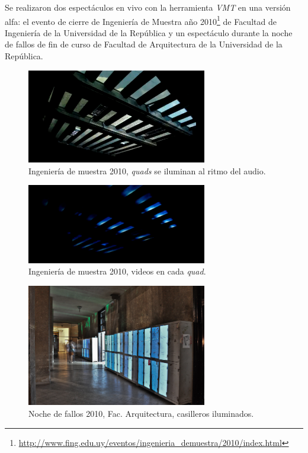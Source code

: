 Se realizaron dos espectáculos en vivo con la herramienta \emph{VMT} en una versión alfa: el evento de cierre de Ingeniería de Muestra año 2010\footnote{\url{http://www.fing.edu.uy/eventos/ingenieria_demuestra/2010/index.html}} de Facultad de Ingeniería de la Universidad de la República y un espectáculo durante la noche de fallos de fin de curso de Facultad de Arquitectura de la Universidad de la República.
\begin{figure}[H]
  \centering
    \includegraphics[width=0.7\textwidth]{./Cap7_conclusiones/ingMuestra1.png}
  \caption[Imagen propia]{Ingeniería de muestra 2010, \emph{quads} se iluminan al ritmo del audio.}
  \label{fig:ingMuestra1}
\end{figure}
\begin{figure}[H]
  \centering
    \includegraphics[width=0.7\textwidth]{./Cap7_conclusiones/ingMuestra2.png}
  \caption[Imagen propia]{Ingeniería de muestra 2010, videos en cada \emph{quad}.}
  \label{fig:ingMuestra2}
\end{figure}

\begin{figure}[H]
  \centering
    \includegraphics[width=0.7\textwidth]{./Cap7_conclusiones/Arqui1.jpg}
  \caption[http://www.farq.edu.uy/patio/conferencias-exposiciones-y-seminarios/noche-de-fallos-7.html]{Noche de fallos 2010, Fac. Arquitectura, casilleros iluminados.}
  \label{fig:Arquitectura1}
\end{figure}


